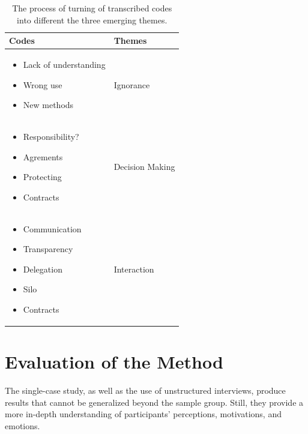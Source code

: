 \begin{table}[]
    \begin{center}
        \begin{tabular}{p{}p{}}
        \toprule
        \textbf{Codes}        & \textbf{Themes} \\ \midrule
        \begin{itemize}
            \item Lack of understanding
            \item Wrong use
            \item New methods
        \end{itemize}         & \vspace{0.4mm}Ignorance       \\ 
        \begin{itemize}
            \item Responsibility?
            \item Agrements
            \item Protecting
            \item Contracts
        \end{itemize}         & \vspace{0.4mm}Decision Making \\
        \begin{itemize}
            \item Communication
            \item Transparency
            \item Delegation
            \item Silo
            \item Contracts
        \end{itemize}         & \vspace{0.4mm}Interaction    
        \end{tabular}
        \caption{The process of turning of transcribed codes into different the three emerging themes.}
        \label{tab:thematic-analysis}
    \end{center}
\end{table}

\section{Evaluation of the Method}
The single-case study, as well as the use of unstructured interviews, produce results that cannot be generalized beyond the sample group. Still, they provide a more in-depth understanding of participants’ perceptions, motivations, and emotions. 

